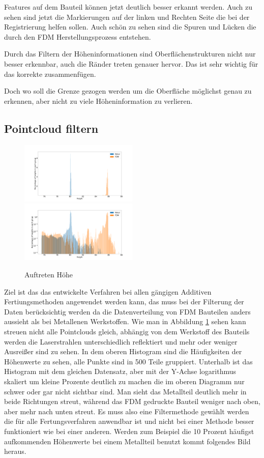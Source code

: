 \documentclass[../main.tex]{subfiles}
\begin{document}
Features auf dem Bauteil können jetzt deutlich besser erkannt werden. Auch zu sehen
sind jetzt die Markierungen auf der linken und Rechten Seite die bei der Registrierung
helfen sollen. Auch schön zu sehen sind die Spuren und Lücken die durch den FDM 
Herstellungsprozess entstehen.

Durch das Filtern der Höheninformationen sind Oberflächenstrukturen nicht nur besser
erkennbar, auch die Ränder treten genauer hervor. Das ist sehr wichtig für das korrekte
zusammenfügen.

Doch wo soll die Grenze gezogen werden um die Oberfläche möglichst genau zu erkennen,
aber nicht zu viele Höheninformation zu verlieren.

\subsection{Pointcloud filtern}

\begin{figure}
    \centering
    \includegraphics[width=0.5\textwidth]{images/height_occurange.png}
    \includegraphics[width=0.5\textwidth]{images/height_occurange_log.png}
    \caption{Auftreten Höhe}
    \label{fig:brightness}
\end{figure}

Ziel ist das das entwickelte Verfahren bei allen gängigen Additiven Fertiungsmethoden
angewendet werden kann, das muss bei der Filterung der Daten berücksichtig werden
da die Datenverteilung von FDM Bauteilen anders aussieht als bei Metallenen Werkstoffen.
Wie man in Abbildung \ref{fig:brightness} sehen kann streuen nicht alle Pointclouds 
gleich, abhängig von dem Werkstoff des Bauteils werden die Laserstrahlen unterschiedlich
reflektiert und mehr oder weniger Ausreißer sind zu sehen. In dem oberen Histogram 
sind die Häufigkeiten der Höhenwerte zu sehen, alle Punkte sind in 500 Teile gruppiert.
Unterhalb ist das Histogram mit dem gleichen Datensatz, aber mit der Y-Achse logarithmus
skaliert um kleine Prozente deutlich zu machen die im oberen Diagramm nur schwer oder 
gar nicht sichtbar sind. Man sieht das Metallteil deutlich mehr in beide Richtungen 
streut, während das FDM gedruckte Bauteil weniger nach oben, aber mehr nach unten 
streut. Es muss also eine Filtermethode gewählt werden die für alle Fertungsverfahren
anwendbar ist und nicht bei einer Methode besser funktioniert wie bei einer 
anderen. Werden zum Beispiel die 10 Prozent häufigst aufkommenden Höhenwerte bei einem
Metallteil benutzt kommt folgendes Bild heraus.
\end{document}
